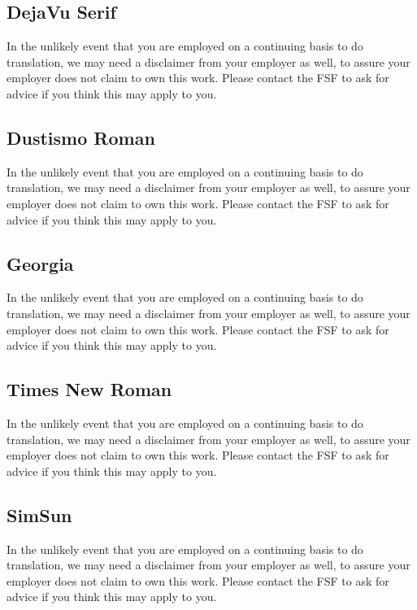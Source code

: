 \documentclass[a4paper,12pt,openany]{book}
\begin{document}
  \subsection{DejaVu Serif}
    In the unlikely event that you are employed on a continuing basis to do
    translation, we may need a disclaimer from your employer as well, to assure
    your employer does not claim to own this work.  Please contact the FSF to
    ask for advice if you think this may apply to you.


  \subsection{Dustismo Roman}
    In the unlikely event that you are employed on a continuing basis to do
    translation, we may need a disclaimer from your employer as well, to assure
    your employer does not claim to own this work.  Please contact the FSF to
    ask for advice if you think this may apply to you.

  \subsection{Georgia}
    In the unlikely event that you are employed on a continuing basis to do
    translation, we may need a disclaimer from your employer as well, to assure
    your employer does not claim to own this work.  Please contact the FSF to
    ask for advice if you think this may apply to you.

  \subsection{Times New Roman}
    In the unlikely event that you are employed on a continuing basis to do
    translation, we may need a disclaimer from your employer as well, to assure
    your employer does not claim to own this work.  Please contact the FSF to
    ask for advice if you think this may apply to you.

  \subsection{SimSun}
    In the unlikely event that you are employed on a continuing basis to do
    translation, we may need a disclaimer from your employer as well, to assure
    your employer does not claim to own this work.  Please contact the FSF to
    ask for advice if you think this may apply to you.
\end{document}
